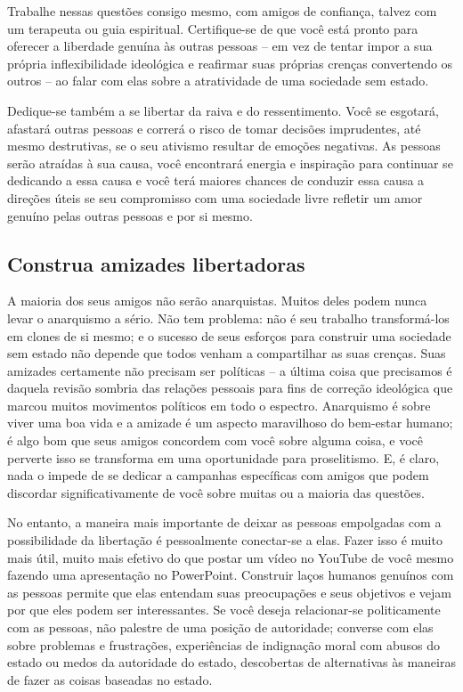 Trabalhe nessas questões consigo mesmo, com amigos de confiança, talvez com um terapeuta ou guia espiritual. Certifique-se de que você está pronto para oferecer a liberdade genuína às outras pessoas -- em vez de tentar impor a sua própria inflexibilidade ideológica e reafirmar suas próprias crenças convertendo os outros -- ao falar com elas sobre a atratividade de uma sociedade sem estado.

Dedique-se também a se libertar da raiva e do ressentimento. Você se esgotará, afastará outras pessoas e correrá o risco de tomar decisões imprudentes, até mesmo destrutivas, se o seu ativismo resultar de emoções negativas. As pessoas serão atraídas à sua causa, você encontrará energia e inspiração para continuar se dedicando a essa causa e você terá maiores chances de conduzir essa causa a direções úteis se seu compromisso com uma sociedade livre refletir um amor genuíno pelas outras pessoas e por si mesmo.

\subsection*{Construa amizades libertadoras}

A maioria dos seus amigos não serão anarquistas. Muitos deles podem nunca levar o anarquismo a sério. Não tem problema: não é seu trabalho transformá-los em clones de si mesmo; e o sucesso de seus esforços para construir uma sociedade sem estado não depende que todos venham a compartilhar as suas crenças. Suas amizades certamente não precisam ser políticas -- a última coisa que precisamos é daquela revisão sombria das relações pessoais para fins de correção ideológica que marcou muitos movimentos políticos em todo o espectro. Anarquismo é sobre viver uma boa vida e a amizade é um aspecto maravilhoso do bem-estar humano; é algo bom que seus amigos concordem com você sobre alguma coisa, e você perverte isso se transforma em uma oportunidade para proselitismo. E, é claro, nada o impede de se dedicar a campanhas específicas com amigos que podem discordar significativamente de você sobre muitas ou a maioria das questões.

No entanto, a maneira mais importante de deixar as pessoas empolgadas com a possibilidade da libertação é pessoalmente conectar-se a elas. Fazer isso é muito mais útil, muito mais efetivo do que postar um vídeo no YouTube de você mesmo fazendo uma apresentação no PowerPoint. Construir laços humanos genuínos com as pessoas permite que elas entendam suas preocupações e seus objetivos e vejam por que eles podem ser interessantes. Se você deseja relacionar-se politicamente com as pessoas, não palestre de uma posição de autoridade; converse com elas sobre problemas e frustrações, experiências de indignação moral com abusos do estado ou medos da autoridade do estado, descobertas de alternativas às maneiras de fazer as coisas baseadas no estado.

